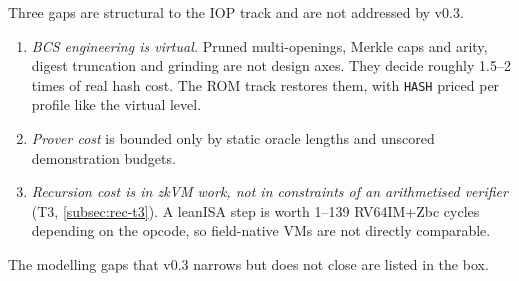 Three gaps are structural to the IOP track and are not addressed by v0.3.
\begin{enumerate}[nosep]
\item \emph{BCS engineering is virtual.} Pruned multi-openings, Merkle caps and arity, digest
  truncation and grinding are not design axes. They decide roughly 1.5--2 times of real hash cost. The
  ROM track restores them, with \texttt{HASH} priced per profile like the virtual level.
\item \emph{Prover cost} is bounded only by static oracle lengths and unscored demonstration budgets.
\item \emph{Recursion cost is in zkVM work, not in constraints of an arithmetised verifier} (T3,
  \cref{subsec:rec-t3}). A leanISA step is worth 1--139 RV64IM+Zbc cycles depending on the opcode, so
  field-native VMs are not directly comparable.
\end{enumerate}
The modelling gaps that v0.3 narrows but does not close are listed in the box.

